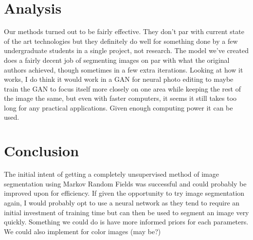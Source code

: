 \documentclass[11pt]{article}
\begin{document}
\section{Analysis}
Our methods turned out to be fairly effective. They don’t par with current state of the art technologies but they definitely do well for something done by a few undergraduate students in a single project, not research. The model we’ve created does a fairly decent job of segmenting images on par with what the original authors achieved, though sometimes in a few extra iterations. Looking at how it works, I do think it would work in a GAN for neural photo editing to maybe train the GAN to focus itself more closely on one area while keeping the rest of the image the same, but even with faster computers, it seems it still takes too long for any practical applications. Given enough computing power it can be used. 

\section{Conclusion}
The initial intent of getting a completely unsupervised method of image segmentation using Markov Random Fields was successful and could probably be improved upon for efficiency. If given the opportunity to try image segmentation again, I would probably opt to use a neural network as they tend to require an initial investment of training time but can then be used to segment an image very quickly. Something we could do is have more informed priors for each parameters. We could also implement for color images (may be?)
\end{document}
